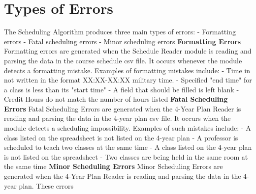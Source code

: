 \documentclass[12pt]{article}
\begin{document}
\section{Types of Errors}
The Scheduling Algorithm produces three main types of errors: \newline
 - Formatting errors \newline
 - Fatal scheduling errors \newline
 - Minor scheduling errors \newline
 \newline
 \textbf{Formatting Errors} \newline
Formatting errors are generated when the Schedule Reader module is reading and parsing the data in the course schedule csv file. It occurs whenever the module detects a formatting mistake. Examples of formatting mistakes include: \newline
 - Time in not written in the format XX:XX-XX:XX military time. \newline
 - Specified "end time" for a class is less than its "start time" \newline
 - A field that should be filled is left blank \newline
 - Credit Hours do not match the number of hours listed \newline
\newline
\textbf{Fatal Scheduling Errors} \newline
Fatal Scheduling Errors are generated when the 4-Year Plan Reader is reading and parsing the data in the 4-year plan csv file. It occurs when the module detects a scheduling impossibility. Examples of such mistakes include: \newline
 - A class listed on the spreadsheet is not listed on the 4-year plan \newline
 - A professor is scheduled to teach two classes at the same time \newline
 - A class listed on the 4-year plan is not listed on the spreadsheet \newline
 - Two classes are being held in the same room at the same time \newline
\newline
\textbf{Minor Scheduling Errors} \newline
Minor Scheduling Errors are generated when the 4-Year Plan Reader is reading and parsing the data in the 4-year plan. These errors
\end{document}
